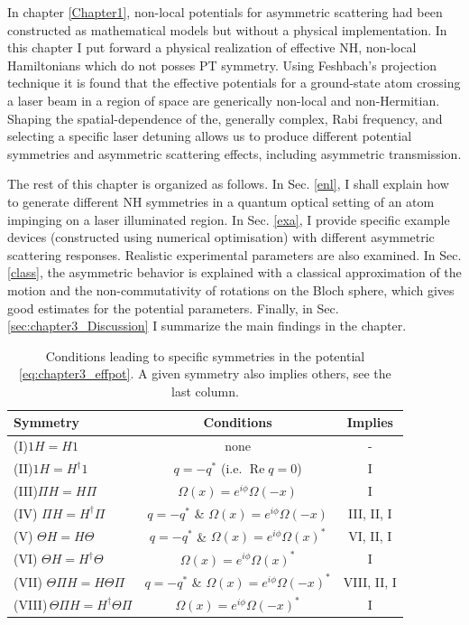 In chapter \ref{Chapter1}, non-local potentials for asymmetric scattering had been constructed as mathematical models but without a physical implementation. In this chapter I put forward a physical realization of effective NH, non-local  Hamiltonians which do not posses PT symmetry. Using Feshbach's projection technique it is found that the effective potentials for a ground-state atom crossing a laser beam in a region of space are generically non-local and non-Hermitian. Shaping the spatial-dependence of the, generally complex, Rabi frequency, and selecting a specific laser detuning allows us to produce different potential symmetries and asymmetric scattering effects, including asymmetric transmission.

The rest of this chapter is organized as follows. In Sec. \ref{enl}, I shall explain how to generate different NH symmetries in a quantum optical setting of an atom impinging on a laser illuminated region. In Sec. \ref{exa}, I provide specific example devices (constructed using numerical optimisation) with different asymmetric scattering responses. Realistic experimental parameters are also examined. In Sec. \ref{class}, the asymmetric behavior is explained with a classical approximation of the motion and the non-commutativity of rotations on the Bloch sphere, which gives good estimates for the potential parameters. Finally, in Sec. \ref{sec:chapter3_Discussion} I summarize the main findings in the chapter.

\begin{table}[t]
  \caption{Conditions leading to  specific symmetries in the potential \eqref{eq:chapter3_effpot}. A given symmetry also implies others, see the last column.\label{tab:chapter3_SymmetriesConditions}}
  \hspace*{-0.1cm}
  \centering
  \begin{tabular}{lcc}
  \hline\hline
  Symmetry& Conditions & Implies
  \\
  \hline
  (I)\;$1H=H1$ &   none & -
  \\
  (II)\;$1H=H^\dagger 1$ &  $q=-q^{*}$ (i.e. $\operatorname{Re}q=0$) & I
  \\
  (III)\;$ \Pi H=H\Pi$ &  $\Omega(x)=e^{i\phi}\Omega(-x)$ & I
  \\
  (IV) $\Pi H=H^\dagger \Pi$ &  $q=-q^{*}$ \& $\Omega(x)=e^{i\phi}\Omega(-x)$ & III,\! II,\! I
  \\
  (V) $\Theta H=H\Theta$ &  $q=-q^{*}$ \& $\Omega(x)=e^{i\phi}\Omega(x)^*$ & {\small VI,\! II,\! I}
  \\
  (VI) $\Theta H=H^\dagger\Theta$ &  $\Omega(x)=e^{i\phi}\Omega(x)^*$ & I
  \\
  (VII) $\Theta\Pi H=H\Theta \Pi$ &  $q=-q^{*}$ \& $\Omega(x)=e^{i\phi}\Omega(-x)^*$ & VIII,\! II,\! I
  \\
  (VIII)\,$\Theta\Pi H=H^\dagger \Theta \Pi$ &  $\Omega(x)=e^{i\phi}\Omega(-x)^*$  & I
  \\
  \hline\hline
  \end{tabular}
\end{table}

